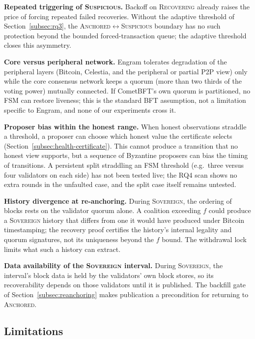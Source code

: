 \textbf{Repeated triggering of \textsc{Suspicious}.} Backoff on
\textsc{Recovering} already raises the price of forcing repeated failed
recoveries. Without the adaptive threshold of Section~\ref{subsec:rq3}, the
\textsc{Anchored}$\leftrightarrow$\textsc{Suspicious} boundary has no such
protection beyond the bounded forced-transaction queue; the adaptive
threshold closes this asymmetry.

\textbf{Core versus peripheral network.} Engram tolerates degradation of
the peripheral layers (Bitcoin, Celestia, and the peripheral or partial P2P
view) only while the core consensus network keeps a quorum (more than two
thirds of the voting power) mutually connected. If CometBFT's own quorum is partitioned, no FSM can
restore liveness; this is the standard BFT assumption, not a limitation
specific to Engram, and none of our experiments cross it.

\textbf{Proposer bias within the honest range.} When honest observations
straddle a threshold, a proposer can choose which honest value the
certificate selects (Section~\ref{subsec:health-certificate}). This cannot
produce a transition that no honest view supports, but a sequence of
Byzantine proposers can bias the timing of transitions. A persistent split
straddling an FSM threshold (e.g.\ three versus four validators on each side)
has not been tested live; the RQ4 scan shows no extra rounds in the unfaulted case, and the
split case itself remains untested.

\textbf{History divergence at re-anchoring.} During \textsc{Sovereign}, the
ordering of blocks rests on the validator quorum alone. A coalition
exceeding $f$ could produce a \textsc{Sovereign} history that differs from
one it would have produced under Bitcoin timestamping; the recovery proof
certifies the history's internal legality and quorum signatures, not its
uniqueness beyond the $f$ bound. The withdrawal lock limits what such a
history can extract.

\textbf{Data availability of the \textsc{Sovereign} interval.} During \textsc{Sovereign}, the interval's block data is held by the validators' own block stores, so its
recoverability depends on those validators until it is published. The
backfill gate of Section~\ref{subsec:reanchoring} makes publication a
precondition for returning to \textsc{Anchored}.

\subsection{Limitations}
\label{subsec:limitations}

